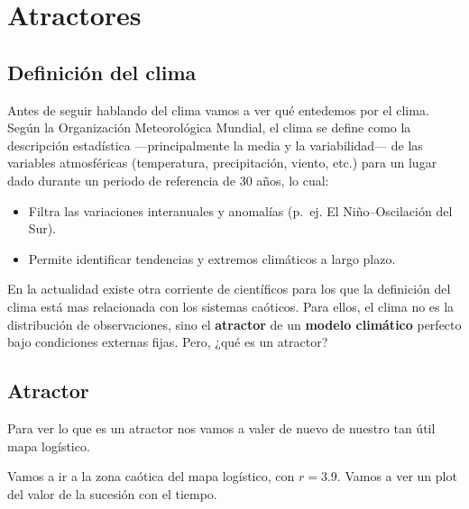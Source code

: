 \documentclass[
  11pt,
  a4paper,
  DIV=11,
  numbers=noendperiod]{scrreprt}
\begin{document}
\chapter{Atractores}\label{atractores}

\section{Definición del clima}\label{definiciuxf3n-del-clima}

Antes de seguir hablando del clima vamos a ver qué entedemos por el
clima. Según la Organización Meteorológica Mundial, el clima se define
como la descripción estadística ---principalmente la media y la
variabilidad--- de las variables atmosféricas (temperatura,
precipitación, viento, etc.) para un lugar dado durante un periodo de
referencia de 30 años, lo cual:

\begin{itemize}
\item
  Filtra las variaciones interanuales y anomalías (p.~ej. El
  Niño--Oscilación del Sur).
\item
  Permite identificar tendencias y extremos climáticos a largo plazo.
\end{itemize}

En la actualidad existe otra corriente de científicos para los que la
definición del clima está mas relacionada con los sistemas caóticos.
Para ellos, el clima no es la distribución de observaciones, sino el
\textbf{atractor} de un \textbf{modelo climático} perfecto bajo
condiciones externas fijas. Pero, ¿qué es un atractor?

\section{Atractor}\label{atractor}

Para ver lo que es un atractor nos vamos a valer de nuevo de nuestro tan
útil mapa logístico.

Vamos a ir a la zona caótica del mapa logístico, con \(r=3.9\). Vamos a
ver un plot del valor de la sucesión con el tiempo.
\end{document}
